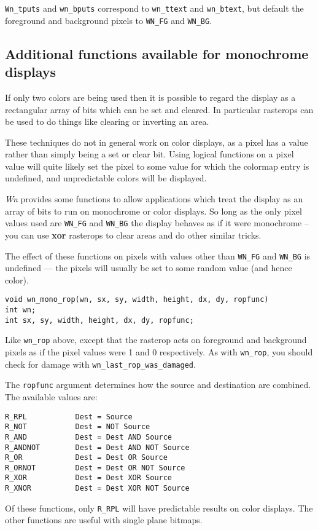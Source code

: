{\tt Wn\_tputs} and {\tt wn\_bputs} correspond to {\tt wn\_ttext} and
{\tt wn\_btext}, but default the foreground and background pixels to
{\tt WN\_FG} and {\tt WN\_BG}.

\subsection{Additional functions available for monochrome displays}
If only two colors are being used then it is possible to regard the display as a
rectangular array of bits which can be set and cleared.
In particular rasterops can be used to do things like clearing or
inverting an area.

These techniques do not in general work on color displays,
as a pixel has a value rather than simply being a set or clear bit.
Using logical functions on a pixel value will quite likely set the
pixel to some value for which the colormap entry is undefined, and
unpredictable colors will be displayed.

{\em Wn} provides some functions to allow applications which treat the
display as an array of bits to run on monochrome or color displays.
So long as the only pixel values used are {\tt WN\_FG} and {\tt WN\_BG} the
display behaves as if it were monochrome -- you can use {\bf xor} rasterops to
clear areas and do other similar tricks.

The effect of these functions on pixels with values other than {\tt WN\_FG}
and {\tt WN\_BG} is undefined --- the pixels will usually be set to some
random value (and hence color).
\begin{verbatim}
void wn_mono_rop(wn, sx, sy, width, height, dx, dy, ropfunc)
int wn;
int sx, sy, width, height, dx, dy, ropfunc;
\end{verbatim}
Like {\tt wn\_rop} above, except that the rasterop acts on foreground and
background pixels as if the pixel values were 1 and 0 respectively.
As with {\tt wn\_rop}, you should check for damage with
{\tt wn\_last\_rop\_was\_damaged}.

The {\tt ropfunc} argument determines how the source and destination
are combined. The available values are:
\pagebreak[3]
\begin{verbatim}
R_RPL           Dest = Source
R_NOT           Dest = NOT Source
R_AND           Dest = Dest AND Source
R_ANDNOT        Dest = Dest AND NOT Source
R_OR            Dest = Dest OR Source
R_ORNOT         Dest = Dest OR NOT Source
R_XOR           Dest = Dest XOR Source
R_XNOR          Dest = Dest XOR NOT Source
\end{verbatim}
Of these functions, only {\tt R\_RPL} will have predictable results on color
displays.
The other functions are useful with single plane bitmaps.

